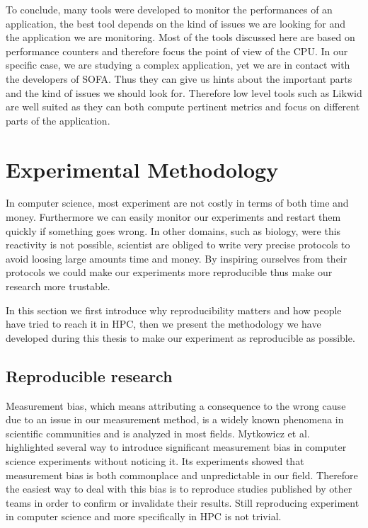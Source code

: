 To conclude, many tools were developed to monitor the performances of an application, the best tool depends on the kind of issues we are looking for and the application we are monitoring.
Most of the tools discussed here are based on performance counters and therefore focus the point of view of the \gls{CPU}.
In our specific case, we are studying a complex application, yet we are in contact with the developers of \gls{SOFA}.
Thus they can give us hints about the important parts and the kind of issues we should look for.
Therefore low level tools such as \gls{Likwid} are well suited as they can both compute pertinent metrics and focus on different parts of the application.

\section{Experimental Methodology}
\label{sec:expe-methodo}

In computer science, most experiment are not costly in terms of both time and money.
Furthermore we can easily monitor our experiments and restart them quickly if something goes wrong.
In other domains, such as biology,  were this reactivity is not possible, scientist are obliged to write very precise protocols to avoid loosing large amounts time and money.
By inspiring ourselves from their protocols we could make our experiments more reproducible thus make our research more trustable.

In this section we first introduce why reproducibility matters and how people have tried to reach it in \gls{HPC}, then we present the methodology we have developed during this thesis to make our experiment as reproducible as possible.


\subsection{Reproducible research}

Measurement bias, which means attributing a consequence to the wrong cause due to an issue in our measurement method, is a widely known phenomena in scientific communities and is analyzed in most fields.
Mytkowicz et al.~\cite{Mytkowicz09Producing} highlighted several way to introduce significant measurement bias in computer science experiments without noticing it.
Its experiments showed that measurement bias is both commonplace and unpredictable in our field.
Therefore the easiest way to deal with this bias is to reproduce studies published by other teams in order to confirm or invalidate their results.
Still reproducing experiment in computer science and more specifically in \gls{HPC} is not trivial.

